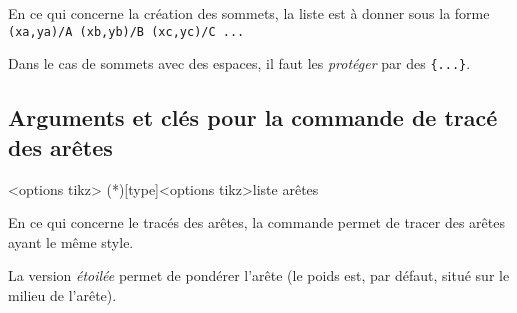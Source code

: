 \documentclass[french,a4paper,11pt]{article}
\begin{document}
{{\begin{tipblock}
En ce qui concerne la création des sommets, la liste est à donner sous la forme \verb!(xa,ya)/A (xb,yb)/B (xc,yc)/C ...!

\smallskip

Dans le cas de sommets avec des espaces, il faut les \textit{protéger} par des \texttt{\{...\}}.
\end{tipblock}

\begin{DemoCode}[]
\begin{GrapheTikz}[CouleurSommets={brown/purple},TypeSommets=ellipse,Police={}]
\end{GrapheTikz}
\end{DemoCode}

\begin{DemoCode}[]
\begin{GrapheTikz}[Epaisseur={very thick},Grille={5,4},DimensionSommets=1.5cm]
\end{GrapheTikz}
\end{DemoCode}

\begin{DemoCode}[]
\begin{GrapheTikz}[TypeSommets=diamond,DimensionSommets=2cm/1.5cm]
\end{GrapheTikz}
\end{DemoCode}

\pagebreak

\subsection{Arguments et clés pour la commande de tracé des arêtes}

\begin{DemoCode}
\begin{GrapheTikz}[clés]<options tikz>
	\GrphTraceAretes(*)[type]<options tikz>{liste arêtes}
\end{GrapheTikz}
\end{DemoCode}

\begin{tipblock}
En ce qui concerne le tracés des arêtes, la commande permet de tracer des arêtes ayant le même style.

\smallskip

La version \textit{étoilée} permet de pondérer l'arête (le poids est, par défaut, situé sur le milieu de l'arête).


\end{tipblock}}}
\end{document}
